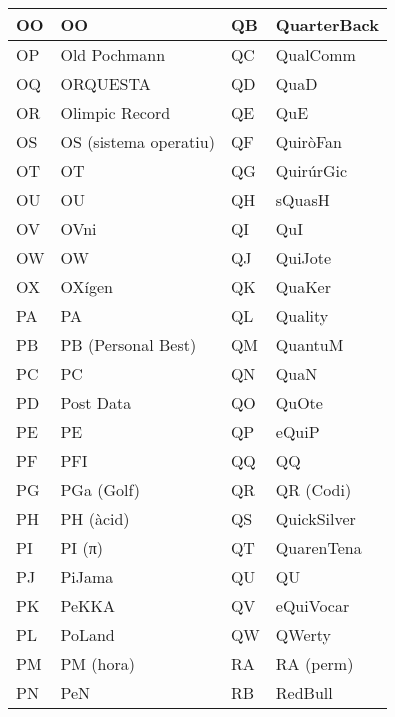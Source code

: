 \begin{table}[!ht]
    \centering
    \begin{tabular}{|l|l|l|l|}
    \hline
    OO & OO                    & QB & QuarterBack      \\ \hline
    OP & Old Pochmann          & QC & QualComm         \\ \hline
    OQ & ORQUESTA              & QD & QuaD             \\ \hline
    OR & Olimpic Record        & QE & QuE              \\ \hline
    OS & OS (sistema operatiu) & QF & QuiròFan         \\ \hline
    OT & OT                    & QG & QuirúrGic        \\ \hline
    OU & OU                    & QH & sQuasH           \\ \hline
    OV & OVni                  & QI & QuI              \\ \hline
    OW & OW                    & QJ & QuiJote          \\ \hline
    OX & OXígen                & QK & QuaKer           \\ \hline
    PA & PA                    & QL & Quality          \\ \hline
    PB & PB (Personal Best)    & QM & QuantuM          \\ \hline
    PC & PC                    & QN & QuaN             \\ \hline
    PD & Post Data             & QO & QuOte            \\ \hline
    PE & PE                    & QP & eQuiP            \\ \hline
    PF & PFI                   & QQ & QQ               \\ \hline
    PG & PGa (Golf)            & QR & QR (Codi)        \\ \hline
    PH & PH (àcid)             & QS & QuickSilver      \\ \hline
    PI & PI (π)                & QT & QuarenTena       \\ \hline
    PJ & PiJama                & QU & QU               \\ \hline
    PK & PeKKA                 & QV & eQuiVocar        \\ \hline
    PL & PoLand                & QW & QWerty           \\ \hline
    PM & PM (hora)             & RA & RA (perm)        \\ \hline
    PN & PeN                   & RB & RedBull          \\ \hline

\end{tabular}
\end{table}

